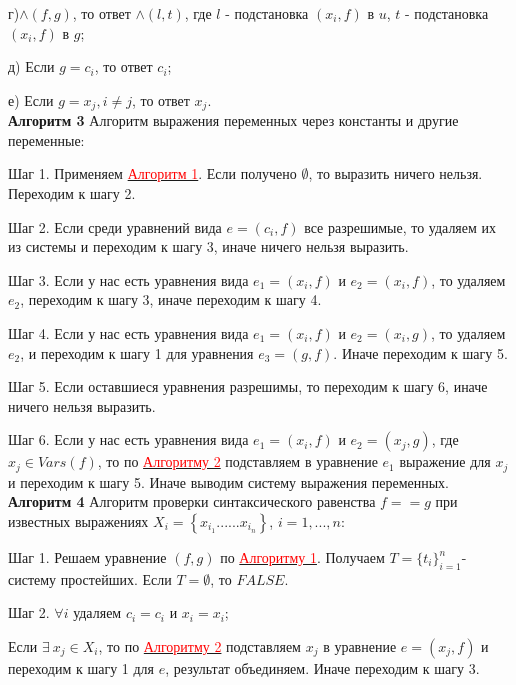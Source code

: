 \documentclass[12pt]{article}
\begin{document}
    г)$\wedge (f, g)$, то ответ $\wedge(l,t)$, где $l$ - подстановка $ (x_{i},f) $ в $u$, $t$ - подстановка $ (x_{i},f) $ в $g$;
    
    д) Если $g = c_{i}$, то ответ $c_{i}$;
    
    е) Если $g = x_{j}, i \neq j$, то ответ $x_{j}$.
     \\
     
      \hypertarget{a3}{{\bf Алгоритм 3}} Алгоритм выражения переменных через константы и другие переменные:
     
     Шаг 1. Применяем \hyperlink{a1}{ \textcolor{red} {Алгоритм 1}}. Если получено $\emptyset$, то выразить ничего нельзя. Переходим к шагу 2.
     
     Шаг 2. Если среди уравнений вида $e =(c_{i},f)$ все разрешимые, то удаляем  их из системы и переходим к шагу 3, иначе ничего нельзя выразить.
     
     Шаг 3. Если у нас есть уравнения вида $e_{1} =(x_{i},f)$ и $e_{2} =(x_{i},f)$, то удаляем $e_{2}$, переходим к шагу 3, иначе переходим к шагу 4.
     
     Шаг 4. Если у нас есть уравнения вида $e_{1} =(x_{i},f)$ и $e_{2} =(x_{i},g)$, то удаляем $e_{2}$, и переходим к  шагу 1 для  уравнения   $e_{3} =(g,f)$. Иначе переходим к шагу 5.
     
     Шаг 5. Если оставшиеся уравнения разрешимы, то переходим к шагу 6, иначе ничего нельзя выразить.
     
     Шаг 6. Если у нас есть уравнения вида $e_{1} =(x_{i},f)$ и $e_{2} =(x_{j},g)$, где $x_{j} \in Vars(f)$, то по \hyperlink{a2}{ \textcolor{red}{Алгоритму 2}} подставляем в уравнение $e_{1}$ выражение для $x_{j}$ и переходим к шагу 5. Иначе выводим систему выражения переменных. 
     \\
     
     \hypertarget{a4}{{\bf Алгоритм 4}} Алгоритм проверки синтаксического равенства $f == g $ при известных выражениях $ X_{i} = \left\lbrace x_{i_{1}} ......x_{i_{n}}\right\rbrace $, $i = 1,...,n$: 
       
     Шаг 1. Решаем уравнение $(f,g)$ по \hyperlink{a1}{ \textcolor{red} {Алгоритму 1}}.  Получаем  $T = \lbrace  t_{i}  \rbrace_{i=1}^{n} $- систему простейших. Если  $ T= {\emptyset}$, то $FALSE$.
     
     Шаг 2. $\forall i$ удаляем $c_{i} = c_{i}$ и $x_{i} = x_{i}$;
    
     Если $\exists \: x_{j} \in X_{i}$, то по \hyperlink{a2}{ \textcolor{red}{Алгоритму 2}} подставляем $x_{j}$  в уравнение $e = (x_{j}, f)$ и переходим к шагу 1 для $e$, результат объединяем. Иначе переходим к шагу 3.
     
\end{document}
